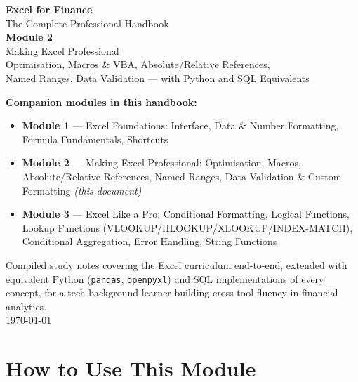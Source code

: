 \documentclass[11pt,a4paper]{article}
\begin{document}
\hypersetup{pageanchor=false}

\begin{titlepage}
\centering
\vspace*{1.5cm}
{\Huge\bfseries\color{excelgreen} Excel for Finance}\\[0.4cm]
{\Large The Complete Professional Handbook}\\[1.2cm]
{\huge\bfseries Module 2}\\[0.3cm]
{\LARGE Making Excel Professional}\\[0.15cm]
{\large Optimisation, Macros \& VBA, Absolute/Relative References,\\ Named Ranges, Data Validation --- with Python and SQL Equivalents}\\[2cm]

\begin{tcolorbox}[colback=excelgreenlight, colframe=excelgreen, width=0.8\textwidth, arc=3pt, before upper=\raggedright]
\textbf{Companion modules in this handbook:}
\begin{itemize}[leftmargin=1.5em]
  \item \textbf{Module 1} --- Excel Foundations: Interface, Data \& Number Formatting, Formula Fundamentals, Shortcuts
  \item \textbf{Module 2} --- Making Excel Professional: Optimisation, Macros, Absolute/Relative References, Named Ranges, Data Validation \& Custom Formatting \textit{(this document)}
  \item \textbf{Module 3} --- Excel Like a Pro: Conditional Formatting, Logical Functions, Lookup Functions (VLOOKUP/HLOOKUP/XLOOKUP/INDEX-MATCH), Conditional Aggregation, Error Handling, String Functions
\end{itemize}
\end{tcolorbox}

\vfill
{\small Compiled study notes covering the Excel curriculum end-to-end, extended with equivalent Python (\texttt{pandas}, \texttt{openpyxl}) and SQL implementations of every concept, for a tech-background learner building cross-tool fluency in financial analytics.}\\[0.3cm]
{\small \today}
\end{titlepage}

\hypersetup{pageanchor=true}
\tableofcontents
\clearpage
{}

\section{How to Use This Module}
\end{document}
